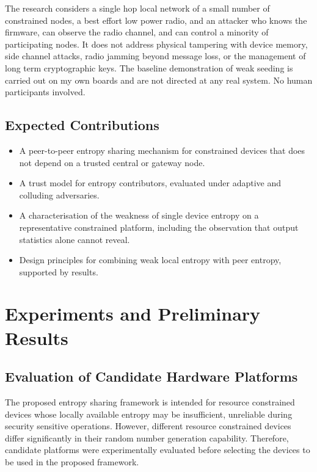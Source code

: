 \documentclass[a4paper, 12pt]{article}
\begin{document}
The research considers a single hop local network of a small number of constrained nodes, a best effort low power radio, and an attacker who knows the firmware, can observe the radio channel, and can control a minority of participating nodes. It does not address physical tampering with device memory, side channel attacks, radio jamming beyond message loss, or the management of long term cryptographic keys. The baseline demonstration of weak seeding is carried out on my own boards and are not directed at any real system. No human participants involved.
 
\subsection{Expected Contributions}
 
\begin{itemize}
    \item A peer-to-peer entropy sharing mechanism for constrained devices that does not depend on a trusted central or gateway node.
    \item A trust model for entropy contributors, evaluated under adaptive and colluding adversaries.
    \item A characterisation of the weakness of single device entropy on a representative constrained platform, including the observation that output statistics alone cannot reveal.
    \item Design principles for combining weak local entropy with peer entropy, supported by results.
\end{itemize}


\section{Experiments and Preliminary Results}
\subsection{Evaluation of Candidate Hardware Platforms}

The proposed entropy sharing framework is intended for
resource constrained devices whose locally available entropy may be
insufficient, unreliable during security sensitive
operations. However, different resource constrained devices differ significantly in
their random number generation capability. Therefore, candidate
platforms were experimentally evaluated before selecting the devices to be
used in the proposed framework.
\end{document}
